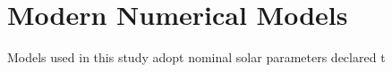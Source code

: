 \section{Modern Numerical Models}
Models used in this study adopt nominal solar parameters declared t